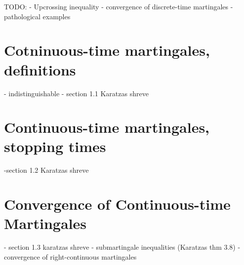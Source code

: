 TODO:
- Upcrossing inequality
- convergence of discrete-time martingales
- pathological examples

\section{Cotninuous-time martingales, definitions}
- indistinguishable
- section 1.1 Karatzas shreve

\section{Continuous-time martingales, stopping times}
-section 1.2 Karatzas shreve

\section{Convergence of Continuous-time Martingales}
- section 1.3 karatzas shreve
- submartingale inequalities (Karatzas thm 3.8)
- convergence of right-continuous martingales
